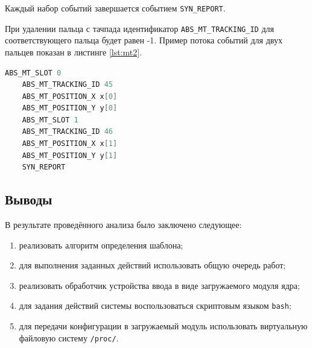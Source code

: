 Каждый набор событий завершается событием \texttt{SYN\_REPORT}. 

При удалении пальца с тачпада идентификатор \texttt{ABS\_MT\_TRACKING\_ID} для соответствующего пальца будет равен -1. Пример потока событий для двух пальцев показан в листинге \ref{lst:mt2}.

\begin{lstlisting}[language=c, label=lst:mt2, caption={Поток событий для двух пальцев}]
	ABS_MT_SLOT 0
	ABS_MT_TRACKING_ID 45
	ABS_MT_POSITION_X x[0]
	ABS_MT_POSITION_Y y[0]
	ABS_MT_SLOT 1
	ABS_MT_TRACKING_ID 46
	ABS_MT_POSITION_X x[1]
	ABS_MT_POSITION_Y y[1]
	SYN_REPORT
\end{lstlisting}

\subsection{Выводы}

В результате проведённого анализа было заключено следующее:
\begin{enumerate}
	\item реализовать алгоритм определения шаблона;
	\item для выполнения заданных действий использовать общую очередь работ;
	\item реализовать обработчик устройства ввода в виде загружаемого модуля ядра;
	\item для задания действий системы воспользоваться скриптовым языком \texttt{bash};
	\item для передачи конфигурации в загружаемый модуль использовать виртуальную файловую систему \texttt{/proc/}.
\end{enumerate}

\clearpage